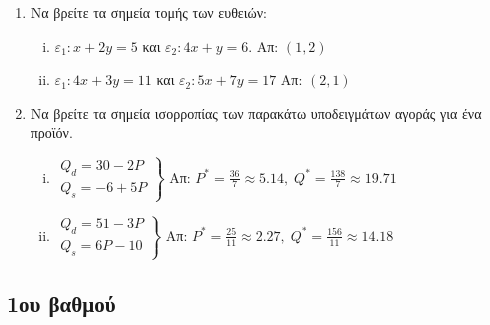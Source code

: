\begin{enumerate}
  \item  Να βρείτε τα  σημεία τομής των ευθειών:
    \begin{enumerate}[i)]
      \item $ \varepsilon_{1}: x + 2y = 5 $   και  $\varepsilon_{2}: 4x + y = 6 $.
        \hfill Απ: $ (1,2) $ 
      \item $ \varepsilon_{1}: 4x+3y=11 $ και  $ \varepsilon_{2}: 5x+7y=17 $ 
        \hfill Απ: $ (2,1) $ 
    \end{enumerate}

  \item Να βρείτε τα σημεία ισορροπίας των παρακάτω υποδειγμάτων αγοράς για ένα προϊόν.
    \begin{enumerate}[i),itemsep=\baselineskip]
      \item $ 
        \left.
          \begin{matrix}
            Q_{d} = 30-2P \\
            Q_{s} = -6+5P
          \end{matrix} 
        \right\}$ 
        \hfill Απ: $ P^{*} = \frac{36}{7} \approx 5.14, \; Q^{*}= \frac{138}{7} 
        \approx 19.71 $

      \item $ 
        \left.
          \begin{matrix}
            Q_{d} = 51 - 3P \\
            Q_{s} = 6P - 10
          \end{matrix} 
        \right\}$ 
        \hfill Απ: $ P^{*} = \frac{25}{11} \approx 2.27, \; Q^{*}= \frac{156}{11} \approx
        14.18 $

    \end{enumerate}
\end{enumerate}


\begin{center}
  \minibox{\large\bfseries  \textcolor{Col1}{Εξισώσεις}}
\end{center}

\subsection*{1ου βαθμού}

